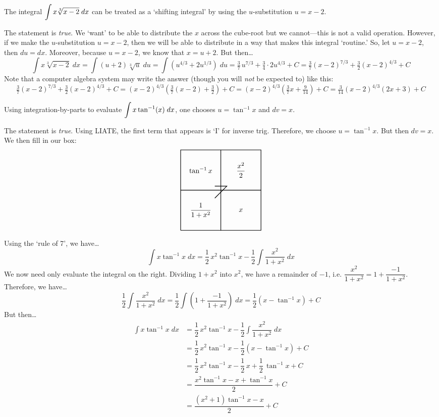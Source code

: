 \documentclass[11pt,letterpaper]{article}
\newcommand{\boxseven}[4]{%
	\draw[thick] (0,0) -- (4,0) -- (4,4) -- (0,4) -- (0,0);
	\draw[thick] (0,2) -- (4,2);
	\draw[thick] (2,0) -- (2,4);
	\draw[line width=0.03cm] (1.7,2.2) -- (2.3,2.2) -- (1.7,1.6);
	\node at (1,3) {$#1$};	%
	\node at (3,1) {$#2$};	%
	\node at (1,1) {$#3$};	%
	\node at (3,3) {$#4$};	%
}
\begin{document}
\thispagestyle{title}

 The integral $\displaystyle\int x \sqrt[3]{x - 2} \;dx$ can be treated as a `shifting integral' by using the $u$-substitution $u= x - 2$. \pspace

\sol The statement is \textit{true}. We `want' to be able to distribute the $x$ across the cube-root but we cannot---this is not a valid operation. However, if we make the $u$-substitution $u= x - 2$, then we will be able to distribute in a way that makes this integral `routine.' So, let $u= x - 2$, then $du= dx$. Moreover, because $u= x - 2$, we know that $x= u + 2$. But then\dots
	\[
	\int x \sqrt[3]{x - 2} \;dx= \int (u + 2) \sqrt[3]{u} \;du= \int \left( u^{4/3} + 2 u^{1/3} \right) \;du= \tfrac{3}{7}\, u^{7/3} + \tfrac{3}{4} \cdot 2u^{4/3} + C= \tfrac{3}{7} (x - 2)^{7/3} + \tfrac{3}{2} (x - 2)^{4/3} + C
	\]
Note that a computer algebra system may write the answer (though you will \textit{not} be expected to) like this:
	\[
	\tfrac{3}{7} (x - 2)^{7/3} + \tfrac{3}{2} (x - 2)^{4/3} + C= (x - 2)^{4/3} \left( \tfrac{3}{7} (x - 2) + \tfrac{3}{2} \right) + C= (x - 2)^{4/3} \left( \tfrac{3}{7}x + \tfrac{9}{14} \right) + C= \tfrac{3}{14} (x - 2)^{4/3} \left( 2x + 3 \right) + C
	\] \pvspace{1.3cm}



 Using integration-by-parts to evaluate $\displaystyle\int x \tan^{-1}(x) \;dx$, one chooses $u= \tan^{-1} x$ and $dv= x$. \pspace

\sol The statement is \textit{true}. Using LIATE, the first term that appears is `I' for inverse trig. Therefore, we choose $u= \tan^{-1} x$. But then $dv= x$. We then fill in our box:
	\[
	\begin{tikzpicture}
	\boxseven{\tan^{-1} x}{x}{\dfrac{1}{1 + x^2}}{\dfrac{x^2}{2}}
	\end{tikzpicture}
	\]
Using the `rule of 7', we have\dots
	\[
	\int x \tan^{-1} x \;dx= \dfrac{1}{2}\, x^2 \tan^{-1} x - \dfrac{1}{2} \int \dfrac{x^2}{1 + x^2} \;dx
	\]
We now need only evaluate the integral on the right. Dividing $1 + x^2$ into $x^2$, we have a remainder of $-1$, i.e. $\dfrac{x^2}{1 + x^2}= 1 + \dfrac{-1}{1 + x^2}$. Therefore, we have\dots
	\[
	\dfrac{1}{2} \int \dfrac{x^2}{1 + x^2} \;dx= \dfrac{1}{2} \int \left( 1 + \dfrac{-1}{1 + x^2} \right) \;dx= \dfrac{1}{2} \left( x - \tan^{-1} x \right) + C
	\]
But then\dots
	\[
	\begin{aligned}
	\int x \tan^{-1} x \;dx&= \dfrac{1}{2}\, x^2 \tan^{-1} x - \dfrac{1}{2} \int \dfrac{x^2}{1 + x^2} \;dx \\[0.3cm]
	&= \dfrac{1}{2}\, x^2 \tan^{-1} x - \dfrac{1}{2} \left( x - \tan^{-1} x \right) + C  \\[0.3cm]
	&= \dfrac{1}{2}\, x^2 \tan^{-1} x - \dfrac{1}{2} \, x + \dfrac{1}{2}\, \tan^{-1} x + C \\[0.3cm]
	&= \dfrac{x^2 \tan^{-1} x - x + \tan^{-1} x}{2} + C \\[0.3cm]
	&= \dfrac{(x^2 + 1) \tan^{-1} x - x}{2} + C
	\end{aligned}
	\] \pvspace{1.3cm}
\end{document}
